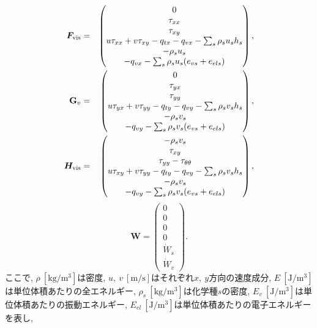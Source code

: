 %
\begin{eqnarray}
  {\bm F}_\mathrm{vis}&=&
  \begin{pmatrix}
  0\\
  \tau_{xx}\\
  \tau_{xy}\\
  u\tau_{xx}+v\tau_{xy}-q_{tx}-q_{vx}-\sum_{s}\rho_{s}u_{s}h_{s}\\
  -\rho_{s}u_{s}\\
  -q_{vx}-\sum_{s}\rho_{s}u_{s}(e_{vs}+e_{els})
  \end{pmatrix}\nonumber,\\
  {\bf G}_v&=&
  \begin{pmatrix}
  0\\
  \tau_{yx}\\
  \tau_{yy}\\
  u\tau_{yx}+v\tau_{yy}-q_{ty}-q_{vy}-\sum_{s}\rho_{s}v_{s}h_{s}\\
  -\rho_{s}v_{s}\\
  -q_{vy}-\sum_{s}\rho_{s}v_{s}(e_{vs}+e_{els})
  \end{pmatrix},\\
  {\bm H}_\mathrm{vis}&=&
  \begin{pmatrix}
  -\rho_{s}v_{s}\\
  \tau_{xy}\\
  \tau_{yy}-\tau_{\theta \theta}\\
  u\tau_{xy}+v\tau_{yy}-q_{ty}-q_{vy}- \sum_{s} \rho_{s}v_{s}h_{s}\\
  -\rho_{s}v_{s}\\
  -q_{vy}-\sum_{s}\rho_{s}v_{s}(e_{vs}+e_{els})
  \end{pmatrix}\nonumber,
\end{eqnarray}
%
\begin{equation}
  {\bm W}=
  \begin{pmatrix}
  0\\
  0\\
  0\\
  0\\
  {\dot W}_{s}\\
  {\dot W}_{v}
  \end{pmatrix}.
  \label{tab:termgen}
\end{equation}
%
ここで,
$\rho~\mathrm{[kg/m^3]}$は密度,
$u,\ v~\mathrm{[m/s]}$はそれぞれ$x,\ y$方向の速度成分,
$E~\mathrm{[J/m^3]}$は単位体積あたりの全エネルギー, 
$\rho_s~\mathrm{[kg/m^3]}$は化学種$s$の密度,
$E_v~\mathrm{[J/m^3]}$は単位体積あたりの振動エネルギー, 
$E_{el}~\mathrm{[J/m^3]}$は単位体積あたりの電子エネルギーを表し, 

